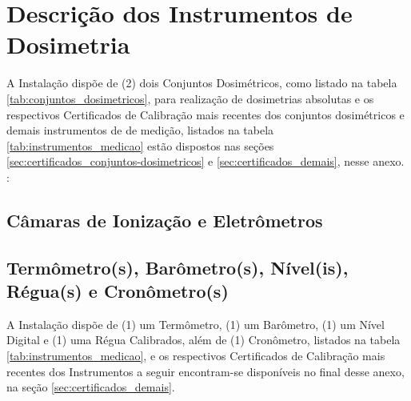 \chapter{Descrição dos Instrumentos de Dosimetria}
\label{ch:descricao_instrumentos-dosimetria}
A Instalação dispõe de (2) dois Conjuntos Dosimétricos, como listado na tabela \ref{tab:conjuntos_dosimetricos}, para realização de dosimetrias absolutas e os respectivos Certificados de Calibração mais recentes dos conjuntos dosimétricos e demais instrumentos de de medição, listados na tabela \ref{tab:instrumentos_medicao} estão dispostos nas seções \ref{sec:certificados_conjuntos-dosimetricos} e \ref{sec:certificados_demais}, nesse anexo.	:

\section{Câmaras de Ionização e Eletrômetros}
\label{sec:camaras_eletrometros}

\begin{table}[!h]
    \centering
    \caption{Conjuntos dosimétricos.}
    \label{tab:conjuntos_dosimetricos}
\end{table}

  
\section{Termômetro(s), Barômetro(s), Nível(is), Régua(s) e Cronômetro(s)}
\label{sec:ter_bar_niv_reg_cro}
A Instalação dispõe de (1) um Termômetro, (1) um Barômetro, (1) um Nível Digital e (1) uma Régua Calibrados, além de (1) Cronômetro, listados na tabela \ref{tab:instrumentos_medicao}, e os respectivos Certificados de Calibração mais recentes dos Instrumentos a seguir encontram-se disponíveis no final desse anexo, na seção \ref{sec:certificados_demais}.

